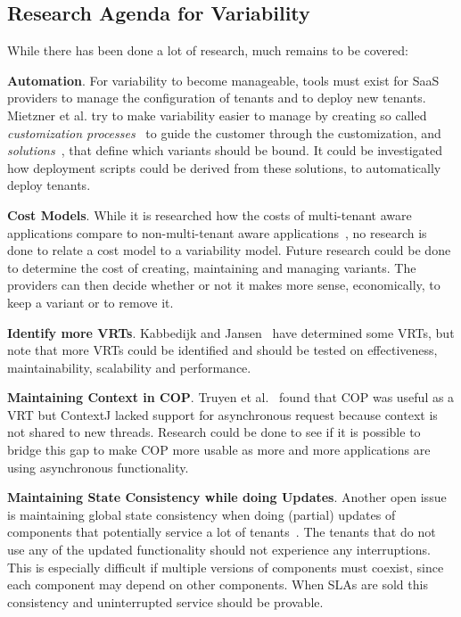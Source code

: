 \subsection{Research Agenda for Variability}\label{sec:var_agenda}
While there has been done a lot of research, much remains to be covered:
\begin{compactitem}

\item \textbf{Automation}.
For variability to become manageable, tools must exist for \ac{SaaS} providers to manage the configuration of tenants and to deploy new tenants. Mietzner et al. try to make variability easier to manage by creating so called \textit{customization processes}~\cite{mietzner2008generation} to guide the customer through the customization, and \textit{solutions}~\cite{mietzner2008defining}, that define which variants should be bound. It could be investigated how deployment scripts could be derived from these solutions, to automatically deploy tenants.

\item \textbf{Cost Models}.
While it is researched how the costs of multi-tenant aware applications compare to non-multi-tenant aware applications~\cite{mietzner2009variability}, no research is done to relate a cost model to a variability model. Future research could be done to determine the cost of creating, maintaining and managing variants. The providers can then decide whether or not it makes more sense, economically, to keep a variant or to remove it.

\item \textbf{Identify more \aclp{VRT}}. 
Kabbedijk and Jansen~\cite{kabbedijk2011variability} have determined some \acp{VRT}, but note that more \acp{VRT} could be identified and should be tested on effectiveness, maintainability, scalability and performance.

\item \textbf{Maintaining Context in \ac{COP}}. 
Truyen et al.~\cite{truyen2012context} found that \ac{COP} was useful as a \ac{VRT} but ContextJ lacked support for asynchronous request because context is not shared to new threads. Research could be done to see if it is possible to bridge this gap to make \ac{COP} more usable as more and more applications are using asynchronous functionality.

\item \textbf{Maintaining State Consistency while doing Updates}.
Another open issue is maintaining global state consistency when doing (partial) updates of components that potentially service a lot of tenants~\cite{truyen2012context,dumitracs2009upgrades}. The tenants that do not use any of the updated functionality should not experience any interruptions. This is especially difficult if multiple versions of components must coexist, since each component may depend on other components. When \acp{SLA} are sold this consistency and uninterrupted service should be provable.

\end{compactitem}
